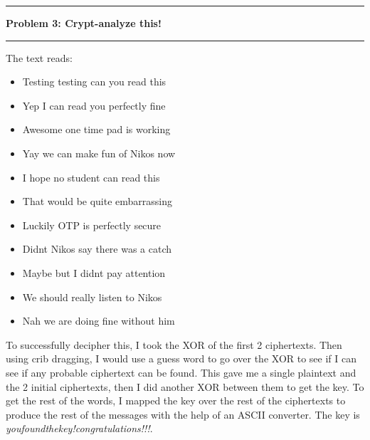 \documentclass[11pt]{article}
\newcommand\question[2]{\vspace{.25in}\hrule\textbf{#1: #2}\vspace{.5em}\hrule\vspace{.10in}}
\begin{document}
\question{Problem 3}{Crypt-analyze this!}
	The text reads:
	\begin{itemize}
		\item Testing testing can you read this
		\item Yep I can read you perfectly fine
		\item Awesome one time pad is working
		\item Yay we can make fun of Nikos now
		\item I hope no student can read this
		\item That would be quite embarrassing
		\item Luckily OTP is perfectly secure
		\item Didnt Nikos say there was a catch
		\item Maybe but I didnt pay attention
		\item We should really listen to Nikos
		\item Nah we are doing fine without him
	\end{itemize}
	To successfully decipher this, I took the XOR of the first 2 ciphertexts. Then using crib dragging, I would use a guess word to go over the XOR to see if I can see if any probable ciphertext can be found. This gave me a single plaintext and the 2 initial ciphertexts, then I did another XOR between them to get the key. To get the rest of the words, I mapped the key over the rest of the ciphertexts to produce the rest of the messages with the help of an ASCII converter. The key is \textit{youfoundthekey!congratulations!!!}. 
\end{document}
